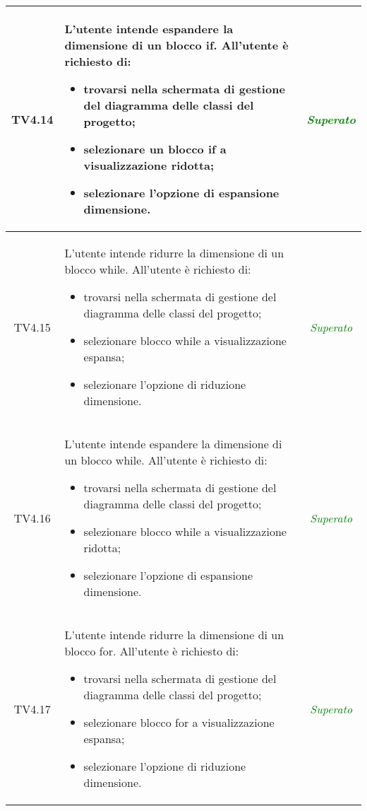\begin{longtable}{|c|>{}m{8cm}|c|}
\hypertarget{TV4.14}{TV4.14} & L'utente intende espandere la dimensione di un blocco if.
All'utente è richiesto di:
\begin{itemize}
	\item trovarsi nella schermata di gestione del diagramma delle classi del progetto;
	\item selezionare un blocco if a visualizzazione ridotta;
	\item selezionare l'opzione di espansione dimensione.
\end{itemize} & \textcolor{Green}{\textit{Superato}}\\ \hline

\hypertarget{TV4.15}{TV4.15} & L'utente intende ridurre la dimensione di un blocco while.
All'utente è richiesto di:
\begin{itemize}
	\item trovarsi nella schermata di gestione del diagramma delle classi del progetto;
	\item selezionare blocco while a visualizzazione espansa;
	\item selezionare l'opzione di riduzione dimensione.
\end{itemize} & \textcolor{Green}{\textit{Superato}}\\ \hline

\hypertarget{TV4.16}{TV4.16} & L'utente intende espandere la dimensione di un blocco while.
All'utente è richiesto di:
\begin{itemize}
	\item trovarsi nella schermata di gestione del diagramma delle classi del progetto;
	\item selezionare blocco while a visualizzazione ridotta;
	\item selezionare l'opzione di espansione dimensione.
\end{itemize} & \textcolor{Green}{\textit{Superato}}\\ \hline

\hypertarget{TV4.17}{TV4.17} & L'utente intende ridurre la dimensione di un blocco for.
All'utente è richiesto di:
\begin{itemize}
	\item trovarsi nella schermata di gestione del diagramma delle classi del progetto;
	\item selezionare blocco for a visualizzazione espansa;
	\item selezionare l'opzione di riduzione dimensione.
\end{itemize} & \textcolor{Green}{\textit{Superato}}\\ \hline


\end{longtable}
